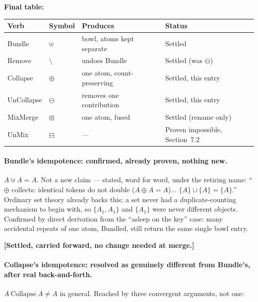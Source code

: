 \documentclass[11pt]{article}
\begin{document}
\textbf{Final table:}
\begin{center}
\begin{tabular}{llll}
Verb & Symbol & Produces & Status \\
\hline
Bundle & $\uplus$ & bowl, atoms kept separate & Settled \\
Remove & $\setminus$ & undoes Bundle & Settled (was $\ominus$) \\
Collapse & $\oplus$ & one atom, count-preserving & Settled, this entry \\
UnCollapse & $\ominus$ & removes one contribution & Settled, this entry \\
MixMerge & $\boxplus$ & one atom, fused & Settled (rename only) \\
UnMix & $\boxminus$ & --- & Proven impossible, Section~7.2 \\
\end{tabular}
\end{center}

\paragraph{Bundle's idempotence: confirmed, already proven, nothing
new.} $A\uplus A=A$. Not a new claim --- stated, word for word, under
the retiring name: ``$\oplus$ collects: identical tokens do not
double ($A\oplus A=A$)... $\{A\}\cup\{A\}=\{A\}$.'' Ordinary set
theory already backs this; a set never had a duplicate-counting
mechanism to begin with, so $\{A_1,A_1\}$ and $\{A_1\}$ were never
different objects. Confirmed by direct derivation from the ``asleep
on the key'' case: many accidental repeats of one atom, Bundled,
still return the same single bowl entry.

\textbf{[Settled, carried forward, no change needed at merge.]}

\paragraph{Collapse's idempotence: resolved as genuinely different
from Bundle's, after real back-and-forth.} $A\ \text{Collapse}\ A \ne
A$ in general. Reached by three convergent arguments, not one:
\end{document}
